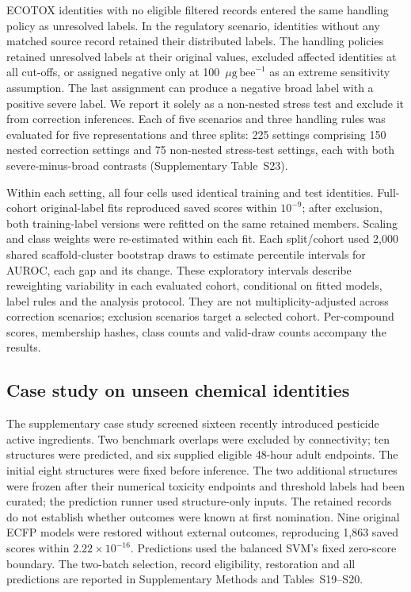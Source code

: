 \documentclass{ieeeaccess}
\newcommand{\ugbee}{\ensuremath{\mu\mathrm{g\,bee}^{-1}}\xspace}
\begin{document}
ECOTOX identities with no eligible filtered records entered the same handling policy as unresolved labels. In the regulatory scenario, identities without any matched source record retained their distributed labels. The handling policies retained unresolved labels at their original values, excluded affected identities at all cut-offs, or assigned negative only at 100~\ugbee as an extreme sensitivity assumption. The last assignment can produce a negative broad label with a positive severe label. We report it solely as a non-nested stress test and exclude it from correction inferences. Each of five scenarios and three handling rules was evaluated for five representations and three splits: 225 settings comprising 150 nested correction settings and 75 non-nested stress-test settings, each with both severe-minus-broad contrasts (Supplementary Table~S23).

Within each setting, all four cells used identical training and test identities. Full-cohort original-label fits reproduced saved scores within \(10^{-9}\); after exclusion, both training-label versions were refitted on the same retained members. Scaling and class weights were re-estimated within each fit. Each split/cohort used 2,000 shared scaffold-cluster bootstrap draws to estimate percentile intervals for AUROC, each gap and its change. These exploratory intervals describe reweighting variability in each evaluated cohort, conditional on fitted models, label rules and the analysis protocol. They are not multiplicity-adjusted across correction scenarios; exclusion scenarios target a selected cohort. Per-compound scores, membership hashes, class counts and valid-draw counts accompany the results.

\subsection{Case study on unseen chemical identities}
The supplementary case study screened sixteen recently introduced pesticide active ingredients. Two benchmark overlaps were excluded by connectivity; ten structures were predicted, and six supplied eligible 48-hour adult endpoints. The initial eight structures were fixed before inference. The two additional structures were frozen after their numerical toxicity endpoints and threshold labels had been curated; the prediction runner used structure-only inputs. The retained records do not establish whether outcomes were known at first nomination. Nine original ECFP models were restored without external outcomes, reproducing 1,863 saved scores within \(2.22\times10^{-16}\). Predictions used the balanced SVM's fixed zero-score boundary. The two-batch selection, record eligibility, restoration and all predictions are reported in Supplementary Methods and Tables~S19--S20.
\end{document}
